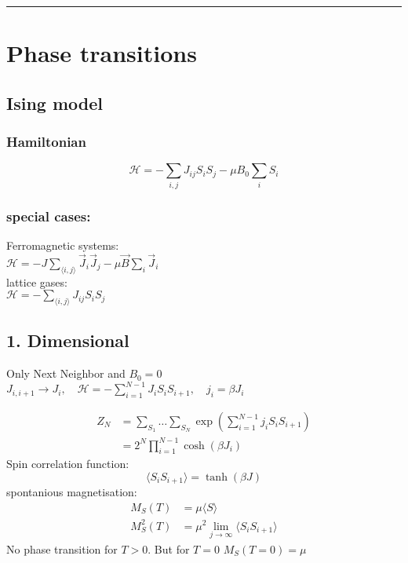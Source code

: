 \noindent\rule[1ex]{\textwidth/5}{1pt}
\section{Phase transitions}

\subsection*{Ising model}

\subsubsection*{Hamiltonian}
\[
    \mathcal{H} = - \sum_{i,j} J_{ij} S_i S_j - \mu B_0 \sum_i S_i
\]

\subsubsection*{special cases:}
Ferromagnetic systems:\\
$\mathcal{H} = -J \sum_{\langle i,j \rangle} \vec{J}_i \vec{J}_j - \mu \vec{B}\sum_i \vec{J}_i$ \\
lattice gases: \\
$\mathcal{H} = -\sum_{\langle i,j \rangle} J_{ij} S_i S_j $ \\


\subsection*{1. Dimensional}
Only Next Neighbor and $B_0 = 0$ \\
$J_{i, i+1} \rightarrow J_i, \quad \mathcal{H} = - \sum_{i=1}^{N-1} J_i S_i S_{i+1}, \quad j_i = \beta J_i$

\[
    \begin{aligned}
        Z_N &= \sum_{S_1} \dots \sum_{S_N} \exp \left(\sum_{i=1}^{N-1} j_i S_i S_{i+1}\right) \\
            &= 2^N \prod_{i=1}^{N-1} \cosh \left( \beta J_i \right)
    \end{aligned}
\]
Spin correlation function:
\[
    \langle S_i S_{i+1} \rangle = \tanh \left( \beta J \right)
\]
spontanious magnetisation:
\[
    \begin{aligned}
        M_S (T) &= \mu \langle S \rangle \\
        M_S^2 (T) &= \mu^2 \lim_{j \rightarrow \infty} \langle S_i S_{i+1} \rangle
    \end{aligned}
\]
No phase transition for $T > 0$. But for $T = 0$ $M_S(T=0) = \mu$

